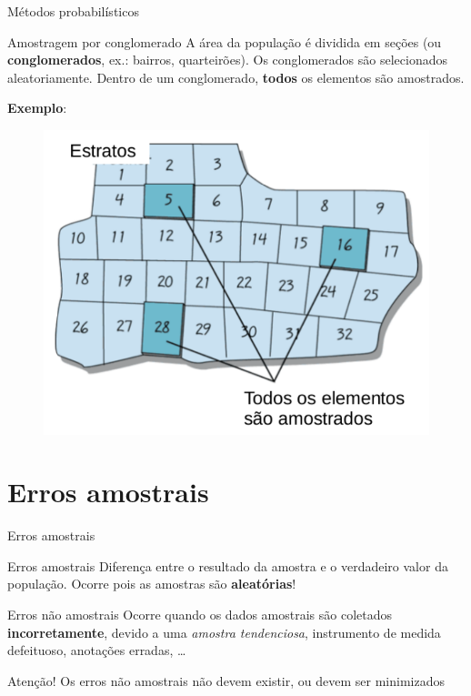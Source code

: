 \documentclass[10pt]{beamer}
\theoremstyle{definition}
\begin{document}
\begin{frame}{Métodos probabilísticos}
  \begin{block}{Amostragem por conglomerado}
    A área da população é dividida em seções (ou
    \textbf{conglomerados}, ex.: bairros, quarteirões). Os conglomerados
    são selecionados aleatoriamente. Dentro de um conglomerado,
    \textbf{todos} os elementos são amostrados.
  \end{block}
  \textbf{Exemplo}:
  \begin{figure}[h]
    \centering
    \includegraphics[width=.5\textwidth]{../img/conglomerado2}
  \end{figure}
\end{frame}

\section{Erros amostrais}

\begin{frame}{Erros amostrais}
  \begin{block}{Erros amostrais}
    Diferença entre o resultado da amostra e o verdadeiro valor da
    população. Ocorre pois as amostras são \textbf{aleatórias}!
  \end{block}
  \vspace{1em}
  \begin{block}{Erros não amostrais}
    Ocorre quando os dados amostrais são coletados
    \textbf{incorretamente}, devido a uma \textsl{amostra tendenciosa},
    instrumento de medida defeituoso, anotações erradas, \ldots
  \end{block}
  \pause
  \begin{alertblock}{Atenção!}
    Os erros não amostrais não devem existir, ou devem ser minimizados
  \end{alertblock}
\end{frame}
\end{document}
